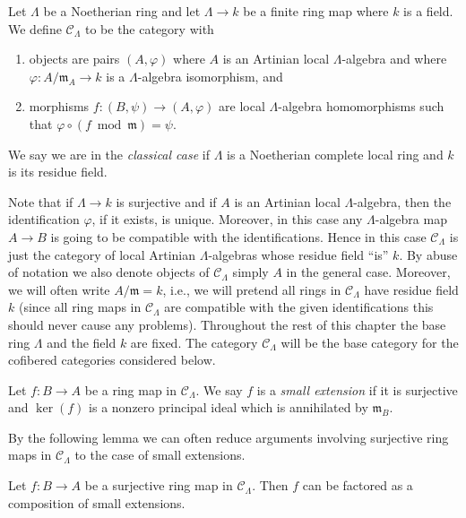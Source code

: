 \begin{definition}
\label{definition-CLambda}
Let $\Lambda$ be a Noetherian ring and let $\Lambda \to k$ be a finite
ring map where $k$ is a field. We define {\it $\mathcal{C}_\Lambda$} to be
the category with
\begin{enumerate}
\item objects are pairs $(A, \varphi)$ where $A$ is an Artinian local
$\Lambda$-algebra and where $\varphi : A/\mathfrak m_A \to k$ is a
$\Lambda$-algebra isomorphism, and
\item morphisms $f : (B, \psi) \to (A, \varphi)$ are local $\Lambda$-algebra
homomorphisms such that $\varphi \circ (f \bmod \mathfrak m) = \psi$.
\end{enumerate}
We say we are in the {\it classical case} if $\Lambda$ is a Noetherian
complete local ring and $k$ is its residue field.
\end{definition}

\noindent
Note that if $\Lambda \to k$ is surjective and if $A$ is an Artinian local
$\Lambda$-algebra, then the identification $\varphi$, if it exists,
is unique. Moreover, in this case any $\Lambda$-algebra map $A \to B$ is
going to be compatible with the identifications. Hence in this case
$\mathcal{C}_\Lambda$ is just the category of local Artinian $\Lambda$-algebras
whose residue field ``is'' $k$. By abuse of notation we also denote objects of
$\mathcal{C}_\Lambda$ simply $A$ in the general case. Moreover, we will
often write $A/\mathfrak m = k$, i.e., we will pretend all rings in
$\mathcal{C}_\Lambda$ have residue field $k$ (since all ring maps in
$\mathcal{C}_\Lambda$ are compatible with the given identifications this
should never cause any problems).
Throughout the rest of this chapter the base ring $\Lambda$ and the
field $k$ are fixed. The category $\mathcal{C}_\Lambda$ will be the base
category for the cofibered categories considered below.

\begin{definition}
\label{definition-small-extension}
Let $f: B \to A$ be a ring map in $\mathcal{C}_\Lambda$.  We say $f$ 
is a {\it small extension} if it is surjective and $\ker(f)$ is a nonzero 
principal ideal which is annihilated by $\mathfrak{m}_{B}$.
\end{definition}

\noindent 
By the following lemma we can often reduce arguments involving surjective ring 
maps in $\mathcal{C}_\Lambda$ to the case of small extensions.

\begin{lemma}
\label{lemma-factor-small-extension}
Let $f: B \to A$ be a surjective ring map in $\mathcal{C}_\Lambda$. 
Then $f$ can be factored as a composition of small extensions.
\end{lemma}

